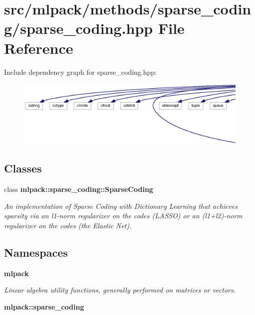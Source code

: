 \section{src/mlpack/methods/sparse\+\_\+coding/sparse\+\_\+coding.hpp File Reference}
\label{sparse__coding_8hpp}
Include dependency graph for sparse\+\_\+coding.\+hpp\+:
\nopagebreak
\begin{figure}[H]
\begin{center}
\leavevmode
\includegraphics[width=350pt]{sparse__coding_8hpp__incl}
\end{center}
\end{figure}
\subsection*{Classes}
\begin{DoxyCompactItemize}
\item 
class {\bf mlpack\+::sparse\+\_\+coding\+::\+Sparse\+Coding}
\begin{DoxyCompactList}\small\item\em An implementation of Sparse Coding with Dictionary Learning that achieves sparsity via an l1-\/norm regularizer on the codes (L\+A\+S\+SO) or an (l1+l2)-\/norm regularizer on the codes (the Elastic Net). \end{DoxyCompactList}\end{DoxyCompactItemize}
\subsection*{Namespaces}
\begin{DoxyCompactItemize}
\item 
 {\bf mlpack}
\begin{DoxyCompactList}\small\item\em Linear algebra utility functions, generally performed on matrices or vectors. \end{DoxyCompactList}\item 
 {\bf mlpack\+::sparse\+\_\+coding}
\end{DoxyCompactItemize}


